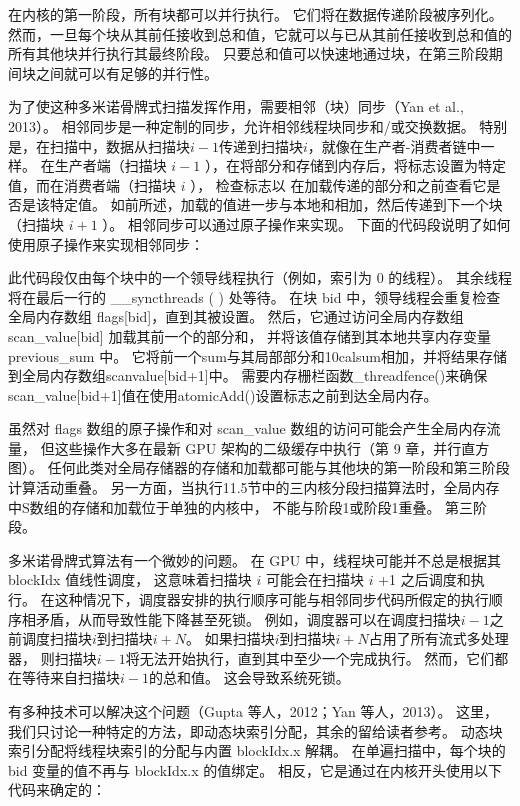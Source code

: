 在内核的第一阶段，所有块都可以并行执行。 它们将在数据传递阶段被序列化。 
然而，一旦每个块从其前任接收到总和值，它就可以与已从其前任接收到总和值的所有其他块并行执行其最终阶段。 
只要总和值可以快速地通过块，在第三阶段期间块之间就可以有足够的并行性。

为了使这种多米诺骨牌式扫描发挥作用，需要相邻（块）同步（Yan et al., 2013）。 
相邻同步是一种定制的同步，允许相邻线程块同步和/或交换数据。 
特别是，在扫描中，数据从扫描块$i-1$传递到扫描块$i$，就像在生产者-消费者链中一样。 
在生产者端（扫描块 $i-1$ ），在将部分和存储到内存后，将标志设置为特定值，而在消费者端（扫描块 $i$ ），
检查标志以 在加载传递的部分和之前查看它是否是该特定值。 
如前所述，加载的值进一步与本地和相加，然后传递到下一个块（扫描块 $i+1$ ）。 
相邻同步可以通过原子操作来实现。 下面的代码段说明了如何使用原子操作来实现相邻同步：

此代码段仅由每个块中的一个领导线程执行（例如，索引为 0 的线程）。 
其余线程将在最后一行的 \_\_syncthreads ( ) 处等待。 
在块 bid 中，领导线程会重复检查全局内存数组 flags[bid]，直到其被设置。 
然后，它通过访问全局内存数组 scan\_value[bid] 加载其前一个的部分和，
并将该值存储到其本地共享内存变量 previous\_sum 中。 
它将前一个sum与其局部部分和10calsum相加，并将结果存储到全局内存数组scanvalue[bid+1]中。 
需要内存栅栏函数\_threadfence()来确保scan\_value[bid+1]值在使用atomicAdd()设置标志之前到达全局内存。

虽然对 flags 数组的原子操作和对 scan\_value 数组的访问可能会产生全局内存流量，
但这些操作大多在最新 GPU 架构的二级缓存中执行（第 9 章，并行直方图）。 
任何此类对全局存储器的存储和加载都可能与其他块的第一阶段和第三阶段计算活动重叠。 
另一方面，当执行11.5节中的三内核分段扫描算法时，全局内存中$\mathrm{S}$数组的存储和加载位于单独的内核中，
不能与阶段1或阶段1重叠。 第三阶段。

多米诺骨牌式算法有一个微妙的问题。 在 GPU 中，线程块可能并不总是根据其 blockIdx 值线性调度，
这意味着扫描块 $i$ 可能会在扫描块 $i$ +1 之后调度和执行。 
在这种情况下，调度器安排的执行顺序可能与相邻同步代码所假定的执行顺序相矛盾，从而导致性能下降甚至死锁。 
例如，调度器可以在调度扫描块$i-1$之前调度扫描块$i$到扫描块$i+N$。 如果扫描块$i$到扫描块$i+N$占用了所有流式多处理器，
则扫描块$i-1$将无法开始执行，直到其中至少一个完成执行。 然而，它们都在等待来自扫描块$i-1$的总和值。 这会导致系统死锁。

有多种技术可以解决这个问题（Gupta 等人，2012；Yan 等人，2013）。 
这里，我们只讨论一种特定的方法，即动态块索引分配，其余的留给读者参考。 
动态块索引分配将线程块索引的分配与内置 blockIdx.x 解耦。 
在单遍扫描中，每个块的 bid 变量的值不再与 blockIdx.x 的值绑定。 相反，它是通过在内核开头使用以下代码来确定的：

